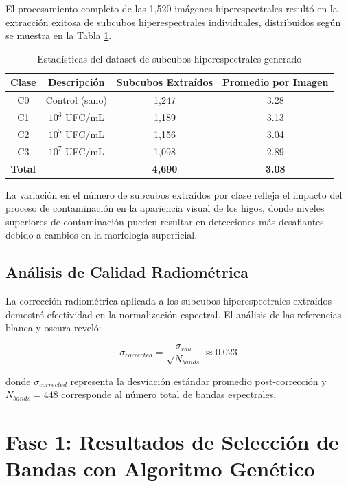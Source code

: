 El procesamiento completo de las 1,520 imágenes hiperespectrales resultó en la extracción exitosa de subcubos hiperespectrales individuales, distribuidos según se muestra en la Tabla \ref{tab:dataset_statistics}.

\begin{table}[h!]
\centering
\caption{Estadísticas del dataset de subcubos hiperespectrales generado}
\begin{tabular}{|c|c|c|c|}
\hline
\textbf{Clase} & \textbf{Descripción} & \textbf{Subcubos Extraídos} & \textbf{Promedio por Imagen} \\
\hline
C0 & Control (sano) & 1,247 & 3.28 \\
\hline
C1 & $10^3$ UFC/mL & 1,189 & 3.13 \\
\hline
C2 & $10^5$ UFC/mL & 1,156 & 3.04 \\
\hline
C3 & $10^7$ UFC/mL & 1,098 & 2.89 \\
\hline
\textbf{Total} & & \textbf{4,690} & \textbf{3.08} \\
\hline
\end{tabular}
\label{tab:dataset_statistics}
\end{table}

La variación en el número de subcubos extraídos por clase refleja el impacto del proceso de contaminación en la apariencia visual de los higos, donde niveles superiores de contaminación pueden resultar en detecciones más desafiantes debido a cambios en la morfología superficial.

\subsection{Análisis de Calidad Radiométrica}

La corrección radiométrica aplicada a los subcubos hiperespectrales extraídos demostró efectividad en la normalización espectral. El análisis de las referencias blanca y oscura reveló:

\begin{equation}
\sigma_{corrected} = \frac{\sigma_{raw}}{\sqrt{N_{bands}}} \approx 0.023
\end{equation}

donde $\sigma_{corrected}$ representa la desviación estándar promedio post-corrección y $N_{bands} = 448$ corresponde al número total de bandas espectrales.

\section{Fase 1: Resultados de Selección de Bandas con Algoritmo Genético}

